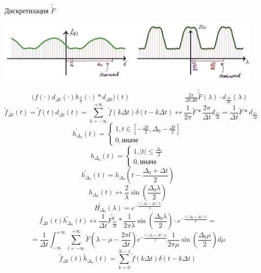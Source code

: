 \newpage
Дискретизация $\widetilde{\widetilde{F}}$ 
\begin{center}
        \includegraphics[width=1\textwidth]{ch5/2.eps}
\end{center}
\(\qquad \qquad \Big(f(\cdot)d_{\Delta t}(\cdot)h_{\frac{T}{2}}(\cdot)*d_{\Delta 0}\Big)(t)\qquad \qquad \qquad \qquad \frac{2\pi}{\Delta t\Delta 0}\widetilde{\widetilde{F}}(\lambda)\cdot d_{\frac{2\pi}{\Delta 0}}(\lambda)\)
\[\widetilde{f}_{\Delta t}(t) = \widetilde{f}(t)d_{\Delta t}(t) = \sum_{k = - \infty}^{+\infty} \widetilde{f}(k\Delta t)\delta(t - k\Delta t) \leftrightarrow \frac{1}{2\pi}\widetilde{F}*\frac{2\pi}{\Delta t}d_{\frac{2\pi}{\Delta t}} = \frac{1}{\Delta t}\widetilde{F}*d_{\frac{2\pi}{\Delta t}}\]
\begin{equation*}
\widetilde{h_{\Delta_0}}(t) = 
 \begin{cases}
   1, t \in [-\frac{\Delta t}{2}, \Delta_0 - \frac{\Delta t}{2}]\\
   0, \texttt{иначе}
 \end{cases}
\end{equation*}
\begin{equation*}
h_{\Delta_0}(t) = 
 \begin{cases}
   1, |t| \leq \frac{\Delta_0}{2}\\
   0, \texttt{иначе}
 \end{cases}
\end{equation*}
\[\widetilde{h_{\Delta_0}}(t) = h_{\Delta_0}(t - \frac{\Delta_0 + \Delta t}{2})\]
\[h_{\Delta_0}(t) \leftrightarrow \frac{2}{\lambda}\sin(\frac{\Delta_0 \lambda}{2})\]
\[\widetilde{H_{\Delta_0}}(\lambda) = e^{-\frac{i(\Delta_0 + \Delta t)\lambda}{2}}\]
\[\widetilde{f_{\Delta t}}(t)\widetilde{h_{\Delta_0}}(t) \leftrightarrow \frac{1}{\Delta t}\widetilde{F_{\frac{2\pi}{\Delta t}}^0}*\frac{1}{2\pi\lambda}\sin(\frac{\Delta_0\lambda}{2})\cdot e^{-\frac{i(\Delta_0 + \Delta t)\lambda}{2}} = \]
\[= \frac{1}{\Delta t}\int_{-\infty}^{+\infty} \sum_{l = -\infty}^{+\infty} \widetilde{F}(\lambda - \mu - \frac{2\pi l}{\Delta t})e^{-\frac{i(\Delta_0 + \Delta t)\mu}{2}}\frac{1}{2\pi\mu}\sin(\frac{\Delta_0 \mu}{2})d\mu\]
\[\widetilde{f}_{\Delta t}(t)\widetilde{h}_{\Delta_0}(t) = \sum_{k = 0}^{N - 1} \widetilde{f}(k\Delta t)\delta(t - k\Delta t)\]
